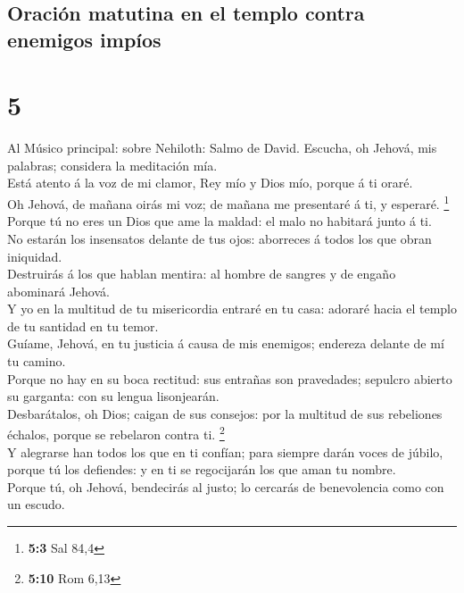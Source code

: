 \hypertarget{oraciuxf3n-matutina-en-el-templo-contra-enemigos-impuxedos}{%
\subsection{Oración matutina en el templo contra enemigos
impíos}\label{oraciuxf3n-matutina-en-el-templo-contra-enemigos-impuxedos}}

\hypertarget{section-4}{%
\section{5}\label{section-4}}

 Al Músico principal: sobre Nehiloth: Salmo de David.
Escucha, oh Jehová, mis palabras; considera la meditación mía.\\
 Está atento á la voz de mi clamor, Rey mío y Dios mío,
porque á ti oraré.\\
 Oh Jehová, de mañana oirás mi voz; de mañana me presentaré
á ti, y esperaré. \footnote{\textbf{5:3} Sal 84,4}\\
 Porque tú no eres un Dios que ame la maldad: el malo no
habitará junto á ti.\\
 No estarán los insensatos delante de tus ojos: aborreces á
todos los que obran iniquidad.\\
 Destruirás á los que hablan mentira: al hombre de sangres y
de engaño abominará Jehová.\\
 Y yo en la multitud de tu misericordia entraré en tu casa:
adoraré hacia el templo de tu santidad en tu temor.\\
 Guíame, Jehová, en tu justicia á causa de mis enemigos;
endereza delante de mí tu camino.\\
 Porque no hay en su boca rectitud: sus entrañas son
pravedades; sepulcro abierto su garganta: con su lengua lisonjearán.\\
 Desbarátalos, oh Dios; caigan de sus consejos: por la
multitud de sus rebeliones échalos, porque se rebelaron contra ti.
\footnote{\textbf{5:10} Rom 6,13}\\
 Y alegrarse han todos los que en ti confían; para siempre
darán voces de júbilo, porque tú los defiendes: y en ti se regocijarán
los que aman tu nombre.\\
 Porque tú, oh Jehová, bendecirás al justo; lo cercarás de
benevolencia como con un escudo.

